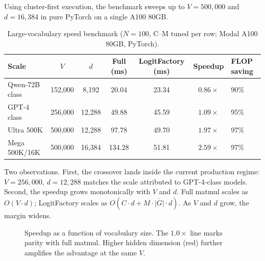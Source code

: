 \documentclass[11pt]{article}
\begin{document}
Using cluster-first execution, the benchmark sweeps up to $V = 500{,}000$ and $d = 16{,}384$ in pure PyTorch on a single A100 80GB.

\begin{table}[h]
\centering
\caption{Large-vocabulary speed benchmark ($N = 100$, C--M tuned per row; Modal A100 80GB, PyTorch).}
\label{tab:scaling}
\begin{tabular}{lccccc}
\toprule
Scale            & $V$       & $d$     & Full (ms) & LogitFactory (ms) & Speedup     & FLOP saving \\
\midrule
Qwen-72B class   & 152{,}000 & 8{,}192 & 20.04     & 23.34             & $0.86\times$ & 90\%        \\
GPT-4 class      & 256{,}000 & 12{,}288 & 49.88    & 45.59             & $1.09\times$ & 95\%        \\
Ultra 500K       & 500{,}000 & 12{,}288 & 97.78    & 49.70             & $1.97\times$ & 97\%        \\
Mega 500K/16K    & 500{,}000 & 16{,}384 & 134.28   & 51.81             & $2.59\times$ & 97\%        \\
\bottomrule
\end{tabular}
\end{table}

Two observations. First, the crossover lands inside the current production regime: $V = 256{,}000$, $d = 12{,}288$ matches the scale attributed to GPT-4-class models. Second, the speedup grows monotonically with $V$ and $d$. Full matmul scales as $O(V \cdot d)$; LogitFactory scales as $O(C \cdot d + M \cdot \overline{|G|} \cdot d)$. As $V$ and $d$ grow, the margin widens.

\begin{figure}[h]
\centering
{}
\caption{Speedup as a function of vocabulary size. The $1.0\times$ line marks parity with full matmul. Higher hidden dimension (red) further amplifies the advantage at the same $V$.}
\label{fig:scaling}
\end{figure}
\end{document}
